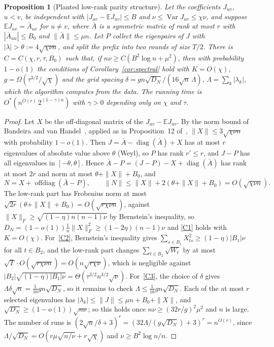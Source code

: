 \documentclass[11pt,a4paper]{article}
\newtheorem{proposition}[theorem]{Proposition}
\theoremstyle{definition}
\theoremstyle{remark}
\newcommand{\Ostar}{O^{*}}
\newcommand{\E}{\mathbb E}
\begin{document}
\begin{proposition}[Planted low-rank parity structure]\label{prop:planted}
Let the coefficients $J_{uv}$, $u<v$, be independent with
$|J_{uv}-\E J_{uv}|\le B$ and $\nu\le\operatorname{Var}J_{uv}\le\chi\nu$, and
suppose $\E J_{uv}=\bar A_{uv}$ for $u\ne v$, where $\bar A$ is a symmetric matrix
of rank at most $r$ with $|\bar A_{uu}|\le B_0$ and $\|\bar A\|\le\mu n$. Let $P$
collect the eigenpairs of $J$ with $|\lambda|>\theta:=4\sqrt{\chi\nu n}$, and
split the prefix into two rounds of size $T/2$. There is $C=C(\chi,r,\tau,B_0)$
such that, if $n\nu\ge C(B^2\log n+\mu^2)$, then with probability $1-o(1)$
the conditions of Corollary~\ref{cor:spectral} hold with $K=O(\chi)$,
$g=\Omega(\tau^{3/2}/\sqrt\chi)$ and the grid spacing
$\delta=gn\sqrt{D_N}/(16\sqrt n\,\Lambda)$, $\Lambda=\sum_k|\lambda_k|$, which the
algorithm computes from the data. The running time is
$\Ostar(n^{O(r)}\,2^{(1-\gamma)n})$ with $\gamma>0$ depending only on $\chi$ and
$\tau$.
\end{proposition}
\begin{proof}
Let $X$ be the off-diagonal matrix of the $J_{uv}-\E J_{uv}$. By the norm bound of
Bandeira and van Handel~\cite{BvH16}, applied as in Proposition~12 of~\cite{CG},
$\|X\|\le3\sqrt{\chi\nu n}$ with probability $1-o(1)$. Then
$J=\bar A-\operatorname{diag}(\bar A)+X$ has at most $r$ eigenvalues of absolute
value above $\theta$ (Weyl), so $P$ has rank $r'\le r$, and $J-P$ has all
eigenvalues in $[-\theta,\theta]$. Hence $\bar A-P=(J-P)-X+\operatorname{diag}(\bar A)$
has rank at most $2r$ and norm at most $\theta+\|X\|+B_0$, and
\[
 N=X+\operatorname{offdiag}(\bar A-P),\qquad
 \|N\|\le\|X\|+2(\theta+\|X\|+B_0)=O(\sqrt{\chi\nu n}).
\]
The low-rank part has Frobenius norm at most
$\sqrt{2r}(\theta+\|X\|+B_0)=O(\sqrt{r\chi\nu n})$, against
$\|X\|_F\ge\sqrt{(1-\eta)n(n-1)\nu}$ by Bernstein's inequality, so
$D_N=(1-o(1))\frac1n\|X\|_F^2\ge(1-2\eta)(n-1)\nu$ and \eqref{C1} holds with
$K=O(\chi)$. For~\eqref{C2}, Bernstein's inequality gives
$\sum_{s\in B_1}X_{ts}^2\ge(1-\eta)|B_1|\nu$ for all $t\in B_2$, and the low-rank
part changes $\sum_{t\in B_2}\sqrt{W_t}$ by at most
$\sqrt{T}\cdot O(\sqrt{r\chi\nu n})=O(n\sqrt{r\chi\nu})$, which is negligible
against $|B_2|\sqrt{(1-\eta)|B_1|\nu}=\Theta(\tau^{3/2}n^{3/2}\sqrt\nu)$.
For~\eqref{C3}, the choice of $\delta$ gives $\Lambda\delta\sqrt n=
\frac1{16}gn\sqrt{D_N}$, so it remains to check $\Lambda\le\frac1{16}gn\sqrt{D_N}$.
Each of the at most $r$ selected eigenvalues has
$|\lambda_k|\le\|J\|\le\mu n+B_0+\|X\|$, and $\sqrt{D_N}\ge(1-o(1))\sqrt{n\nu}$;
so this holds once $n\nu\ge(32r/g)^2\mu^2$ and $n$ is large. The number of runs
is $(2\sqrt n/\delta+3)^r=(32\Lambda/(g\sqrt{D_N})+3)^r=n^{O(r)}$, since
$\Lambda/\sqrt{D_N}=O(r\mu\sqrt{n/\nu}+r\sqrt\chi)$ and $\nu\ge B^2\log n/n$.
\end{proof}
\end{document}
